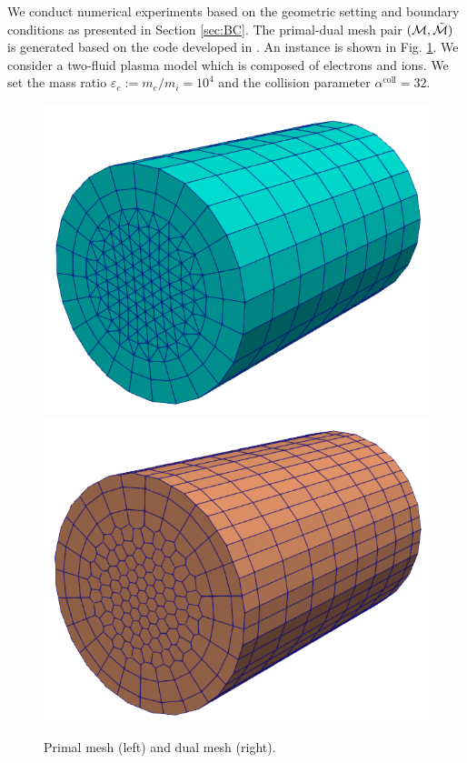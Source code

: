 \documentclass{article}
\begin{document}
We conduct numerical experiments based on the geometric setting and boundary conditions as presented in Section \ref{sec:BC}. The primal-dual mesh pair $(\mathcal{M}, \Tilde{\mathcal{M}})$ is generated based on the code developed in \cite[][ch. 1]{fuchs_2021}. An instance is shown in Fig. \ref{fig:primal_dual_meshes}. We consider a two-fluid plasma model which is composed of electrons and ions. We set the mass ratio $\varepsilon_e := m_e / m_i = 10^4$ and the collision parameter $\alpha^\text{coll} = 32$.
\begin{figure}
    \centering
    \includegraphics[scale=0.3]{primal_mesh.png}
    \hspace{1cm}
    \includegraphics[scale=0.3]{dual_mesh.png}
    \caption{Primal mesh (left) and dual mesh (right).}
    \label{fig:primal_dual_meshes}
\end{figure}
\end{document}
